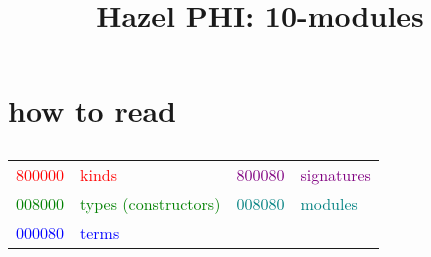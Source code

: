 \documentclass[12pt,fleqn]{article}
\newcommand{\red}[1]{\textcolor{red}{#1}}
\newcommand{\green}[1]{\textcolor{green}{#1}}
\newcommand{\blue}[1]{\textcolor{blue}{#1}}
\newcommand{\purple}[1]{\textcolor{purple}{#1}}
\newcommand{\teal}[1]{\textcolor{teal}{#1}}
\begin{document}
\title{Hazel PHI: 10-modules}
\author{}
\date{}
\maketitle
\section{how to read}
\subsection*{}
\begin{tabular}{rlrl}
    \red{800000} & \red{kinds} & \purple{800080} & \purple{signatures} \\
    \green{008000} & \green{types (constructors)} & \teal{008080} & \teal{modules} \\
    \blue{000080} & \blue{terms} && \\
\end{tabular}
\end{document}

